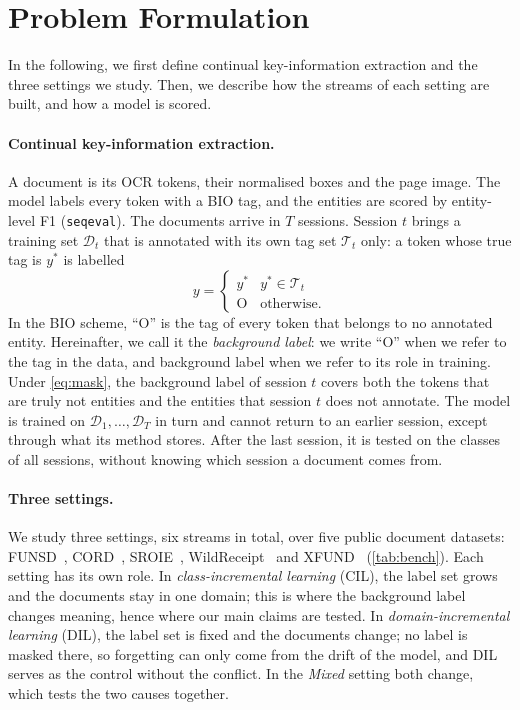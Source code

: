 \documentclass[10pt,twocolumn,letterpaper]{article}
\begin{document}
\section{Problem Formulation}
\label{sec:setup}
In the following, we first define continual key-information extraction and the three settings we study. Then, we describe how the streams of each setting are built, and how a model is scored.

\paragraph{Continual key-information extraction.} A document is its OCR tokens, their normalised boxes and the page image. The model labels every token with a BIO tag, and the entities are scored by entity-level F1 (\texttt{seqeval}). The documents arrive in $T$ sessions. Session $t$ brings a training set $\mathcal{D}_t$ that is annotated with its own tag set $\mathcal{T}_t$ only: a token whose true tag is $y^{\ast}$ is labelled
\begin{equation}
y=\begin{cases} y^{\ast} & y^{\ast}\in\mathcal{T}_t\\ \mathrm{O} & \text{otherwise.}\end{cases}
\label{eq:mask}
\end{equation}
In the BIO scheme, ``O'' is the tag of every token that belongs to no annotated entity. Hereinafter, we call it the \emph{background label}: we write ``O'' when we refer to the tag in the data, and background label when we refer to its role in training. Under \cref{eq:mask}, the background label of session $t$ covers both the tokens that are truly not entities and the entities that session $t$ does not annotate. The model is trained on $\mathcal{D}_1,\dots,\mathcal{D}_T$ in turn and cannot return to an earlier session, except through what its method stores. After the last session, it is tested on the classes of all sessions, without knowing which session a document comes from.

\paragraph{Three settings.} We study three settings, six streams in total, over five public document datasets: FUNSD~\citep{jaume2019funsd}, CORD~\citep{park2019cord}, SROIE~\citep{huang2019sroie}, WildReceipt~\citep{sun2021sdmgr} and XFUND~\citep{xu2022xfund} (\cref{tab:bench}). Each setting has its own role. In \emph{class-incremental learning} (CIL), the label set grows and the documents stay in one domain; this is where the background label changes meaning, hence where our main claims are tested. In \emph{domain-incremental learning} (DIL), the label set is fixed and the documents change; no label is masked there, so forgetting can only come from the drift of the model, and DIL serves as the control without the conflict. In the \emph{Mixed} setting both change, which tests the two causes together.
\end{document}
